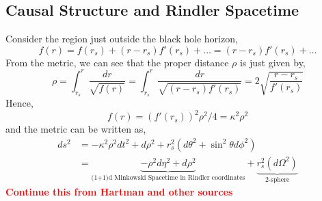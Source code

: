 \documentclass[a4paper,11pt]{article}
\begin{document}
\subsection{Causal Structure and Rindler Spacetime}
Consider the region just outside the black hole horizon,
\begin{equation*}
f(r) = f(r_s) + (r-r_s)f'(r_s) + \ldots= (r-r_s)f'(r_s) + \ldots
\end{equation*}
From the metric, we can see that the proper distance $ \rho $ is just given by,
\begin{equation*}
\rho = \int_{r_s}^r \dfrac{dr}{\sqrt{f(r)}} = \int_{r_s}^r \dfrac{dr}{\sqrt{(r-r_s)f'(r_s)}} = 2\sqrt{\frac{r-r_s}{f'(r_s)}}
\end{equation*}
Hence,
\begin{equation*}
f(r) = (f'(r_s))^2\rho^2/4 = \kappa^2 \rho^2
\end{equation*}
and the metric can be written as,
\begin{align*}
ds^2 &= - \kappa^2 \rho^2 dt^2 + d\rho^2 +  r_s^2(d\theta^2 + \sin^2 \theta d\phi^2)\\
&=   \underbrace{-\rho^2 d\eta^2 + d\rho^2}_{\text{(1+1)d Minkowski Spacetime in Rindler coordinates}} +  \underbrace{r_s^2(d\Omega^2)}_{\text{2-sphere}}
\end{align*}
\textbf{\textcolor{red}{Continue this from Hartman and other sources}}
\end{document}
